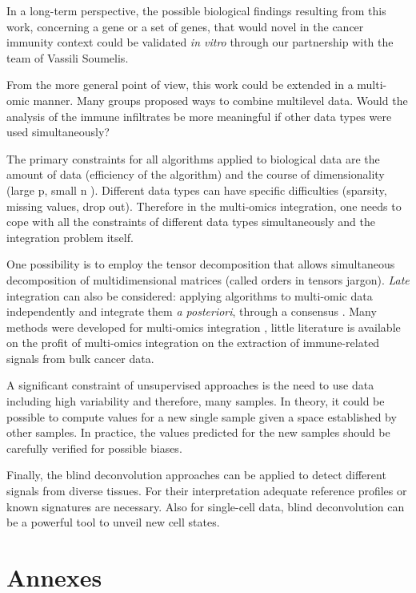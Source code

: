 \documentclass[12pt,]{book}
\theoremstyle{definition}
\theoremstyle{definition}
\theoremstyle{definition}
\theoremstyle{remark}
\begin{document}
In a long-term perspective, the possible biological findings resulting
from this work, concerning a gene or a set of genes, that would novel in
the cancer immunity context could be validated \emph{in vitro} through
our partnership with the team of Vassili Soumelis.

From the more general point of view, this work could be extended in a
multi-omic manner. Many groups proposed ways to combine multilevel data.
Would the analysis of the immune infiltrates be more meaningful if other
data types were used simultaneously?

The primary constraints for all algorithms applied to biological data
are the amount of data (efficiency of the algorithm) and the course of
dimensionality (large p, small n ). Different data types can have
specific difficulties (sparsity, missing values, drop out). Therefore in
the multi-omics integration, one needs to cope with all the constraints
of different data types simultaneously and the integration problem
itself.

One possibility is to employ the tensor decomposition that allows
simultaneous decomposition of multidimensional matrices
\citep{Teschendorff2018, Taguchi2017} (called orders in tensors jargon).
\emph{Late} integration can also be considered: applying algorithms to
multi-omic data independently and integrate them \emph{a posteriori},
through a consensus \citep{Bonnet2015}. Many methods were developed for
multi-omics integration \citep{Huang2017}, little literature is
available on the profit of multi-omics integration on the extraction of
immune-related signals from bulk cancer data.

A significant constraint of unsupervised approaches is the need to use
data including high variability and therefore, many samples. In theory,
it could be possible to compute values for a new single sample given a
space established by other samples. In practice, the values predicted
for the new samples should be carefully verified for possible biases.

Finally, the blind deconvolution approaches can be applied to detect
different signals from diverse tissues. For their interpretation
adequate reference profiles or known signatures are necessary. Also for
single-cell data, blind deconvolution can be a powerful tool to unveil
new cell states.

\hypertarget{annexes}{%
\chapter*{Annexes}\label{annexes}}
\end{document}
